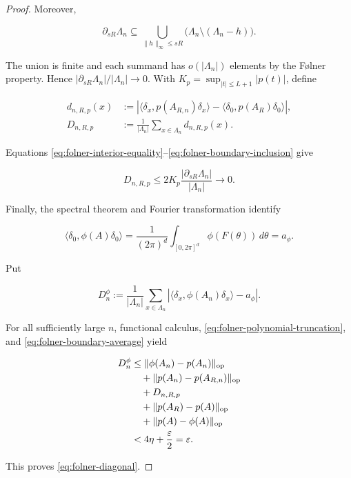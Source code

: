 \begin{proof}
Moreover,

\begin{equation}\label{eq:folner-boundary-inclusion}
\partial_{sR}\Lambda_n
\subseteq
\bigcup_{\|h\|_\infty\le sR}
\bigl(\Lambda_n\setminus(\Lambda_n-h)\bigr).
\end{equation}

The union is finite and each summand has \(o(|\Lambda_n|)\) elements by the
Følner property. Hence
\(|\partial_{sR}\Lambda_n|/|\Lambda_n|\to0\).
With
\(K_p=\sup_{|t|\le L+1}|p(t)|\), define

\begin{align*}
d_{n,R,p}(x)
&:=
\left|
\langle\delta_x,p(A_{R,n})\delta_x\rangle
-\langle\delta_0,p(A_R)\delta_0\rangle
\right|,\\
D_{n,R,p}
&:=\frac1{|\Lambda_n|}\sum_{x\in\Lambda_n}d_{n,R,p}(x).
\end{align*}

Equations
\eqref{eq:folner-interior-equality}--\eqref{eq:folner-boundary-inclusion} give

\begin{equation}\label{eq:folner-boundary-average}
D_{n,R,p}
\le2K_p\frac{|\partial_{sR}\Lambda_n|}{|\Lambda_n|}
\longrightarrow0.
\end{equation}

Finally, the spectral theorem and Fourier transformation identify

\[
\langle\delta_0,\phi(A)\delta_0\rangle
=\frac1{(2\pi)^d}\int_{[0,2\pi]^d}\phi(F(\theta))\,d\theta
=a_\phi.
\]

Put

\[
D_n^\phi:=\frac1{|\Lambda_n|}\sum_{x\in\Lambda_n}
\left|\langle\delta_x,\phi(A_n)\delta_x\rangle-a_\phi\right|.
\]

For all sufficiently large \(n\), functional calculus,
\eqref{eq:folner-polynomial-truncation}, and
\eqref{eq:folner-boundary-average} yield

\begin{align*}
D_n^\phi
&\le
\|\phi(A_n)-p(A_n)\|_{\rm op}\\
&\quad+\|p(A_n)-p(A_{R,n})\|_{\rm op}\\
&\quad+D_{n,R,p}\\
&\quad+\|p(A_R)-p(A)\|_{\rm op}\\
&\quad+\|p(A)-\phi(A)\|_{\rm op}\\
&<4\eta+\frac{\varepsilon}{2}=\varepsilon.
\end{align*}

This proves \eqref{eq:folner-diagonal}.
\end{proof}

